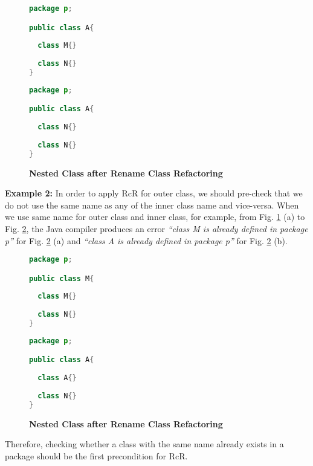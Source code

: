\begin{figure}[th]
\centering
\begin{minipage}[t]{0.45\linewidth}
\begin{lstlisting}[language=java, basicstyle=\scriptsize\ttfamily,frame=single]
package p;

public class A{	
  
  class M{}
	
  class N{}
} 
\end{lstlisting}
\end{minipage}
\hfill
\begin{minipage}[t]{0.45\linewidth}
\begin{lstlisting}[language=java, basicstyle=\scriptsize\ttfamily,frame=single]
package p;

public class A{	
    
  class N{}
    
  class N{}
} 
\end{lstlisting}
\end{minipage}
\caption{\textbf{Nested Class after Rename Class Refactoring}}
\label{figure:nestedclass1}
\end{figure}


\textbf{Example 2:} In order to apply RcR for outer class, we should pre-check that we do not use the same name as any of the inner class name and vice-versa. 
When we use same name for outer class and inner class, for example, from Fig. \ref{figure:nestedclass1} (a) to Fig. \ref{figure:nestedclass2},  the Java compiler produces an error \textit{``class M is already defined in package p''} for Fig. \ref{figure:nestedclass2} (a) and \textit{``class A is already defined in package p''} for Fig. \ref{figure:nestedclass2} (b).

\begin{figure}[th]
\centering
\begin{minipage}[t]{0.45\linewidth}
\begin{lstlisting}[language=java, basicstyle=\scriptsize\ttfamily,frame=single]
package p;

public class M{	
  
  class M{}
	
  class N{}
} 
\end{lstlisting}
\end{minipage}
\hfill
\begin{minipage}[t]{0.45\linewidth}
\begin{lstlisting}[language=java, basicstyle=\scriptsize\ttfamily,frame=single]
package p;

public class A{	
    
  class A{}
    
  class N{}
} 
\end{lstlisting}
\end{minipage}
\caption{\textbf{Nested Class after Rename Class Refactoring}}
\label{figure:nestedclass2}
\end{figure}

Therefore, checking whether a class with the same name already exists in a package should be the first precondition for RcR. 
   
